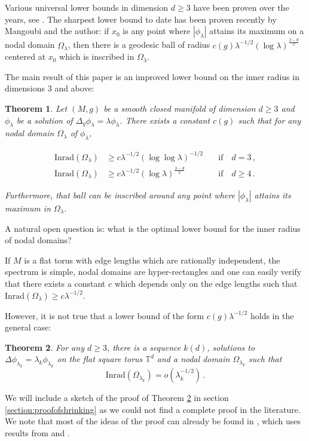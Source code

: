 \documentclass{amsart}
\newtheorem{theorem}{Theorem}[section]
\begin{document}
Various universal lower bounds in dimension $d \geq 3$ have been proven over the years, see \cites{geor, mang-inrad, mang-la} . The sharpest lower bound to date has been proven recently by Mangoubi and the author: if $x_0$ is any point where $|\phi_\lambda|$ attains its maximum on a nodal domain $\Omega_\lambda$, then there is a geodesic ball of radius $c(g) \lambda^{-1/2} (\log \lambda)^{\frac{2-d}{2}}$ centered at $x_0$ which is inscribed in $\Omega_\lambda$.


    The main result of this paper is an improved lower bound on the inner radius in dimensions $3$ and above:


\begin{theorem}\label{theorem:maintheorem}
    Let $(M,g)$ be a smooth closed manifold of dimension $d \geq 3$ and $\phi_\lambda$ be a solution of \linebreak $\Delta_g \phi_\lambda = \lambda \phi_\lambda$. There exists a constant $c(g)$ such that for any nodal domain $\Omega_\lambda$ of $\phi_\lambda$, 

    \begin{align}
        \text{Inrad}(\Omega_\lambda) &\geq  c\lambda^{-1/2}(\log\log\lambda)^{-1/2}  \quad & \text{if} \quad d=3 \, , \label{eq1}\\
    \text{Inrad}(\Omega_\lambda) &\geq c \lambda^{-1/2}(\log\lambda)^{\frac{3-d}{2}} \quad & \text{if} \quad d \geq 4 \, . \label{eq2}
    \end{align}

    Furthermore, that ball can be inscribed around any point where $|\phi_\lambda|$ attains its maximum in $\Omega_\lambda$.
\end{theorem}

A natural open question is: what is the optimal lower bound for the inner radius of nodal domains? 

If $M$ is a flat torus with edge lengths which are rationally independent, the spectrum is simple, nodal domains are hyper-rectangles and one can easily verify that there exists a constant $c$ which depends only on the edge lengths such that $\text{Inrad}(\Omega_\lambda) \geq c \lambda^{-1/2} $. 


However, it is not true that a lower bound of the form $c(g) \lambda^{-1/2}$ holds in the general case:


\begin{theorem}\label{theorem:maintheoremshrinking}
    For any $d \geq 3$, there is a sequence $k(d)$, solutions to  $\Delta\phi_{\lambda_{k}} = \lambda_k \phi_{\lambda_k}$ on the flat square torus $\mathbb T^d$ and a nodal domain $\Omega_{\lambda_k}$ such that $$\text{Inrad}(\Omega_{\lambda_k}) =o\left(\lambda_k^{-1/2}\right) \, .$$
\end{theorem}
We will include a sketch of the proof of Theorem \ref{theorem:maintheoremshrinking}  in section \ref{section:proofofshrinking} as we could not find a complete proof in the literature. We note that most of the ideas of the proof can already be found in \cite{enc-persal1}, which uses results from \cite{enc-persal2} and \cite{enc-persal3}.
\end{document}

